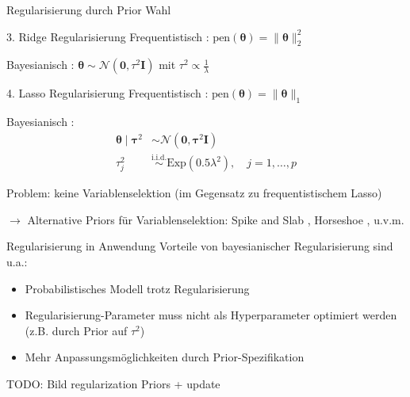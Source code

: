 \documentclass[
  ignorenonframetext,
  aspectratio=169,
]{beamer}
\providecommand{\tightlist}{%
  \setlength{\itemsep}{0pt}\setlength{\parskip}{0pt}}
\newcommand{\bnull}{\bm{0}}
\newcommand{\bI}{\bm{I}}
\newcommand{\Ncal}{\mathcal{N}}
\newcommand{\btheta}{\bm{\theta}}
\newcommand{\btaus}{\bm{\tau}^2}
\newcommand{\taus}{\tau^2}
\begin{document}
\begin{frame}{Regularisierung durch Prior Wahl}
\protect{}\label{regularisierung-durch-prior-wahl}
\begin{block}{3. Ridge Regularisierung}
\protect{}\label{ridge-regularisierung}
Frequentistisch \autocite{hoerl_ridge_1970,hoerl_ridge_1970-1}:
\(\text{pen}(\btheta) = \|\btheta\|_2^2\)

Bayesianisch \autocite{mackay_bayesian_1992}:
\(\btheta \sim \Ncal(\bnull, \taus \bI)\) mit
\(\taus \propto \frac{1}{\lambda}\)
\end{block}

\begin{block}{4. Lasso Regularisierung}
\protect{}\label{lasso-regularisierung}
Frequentistisch \autocite{tibshirani_regression_1996}:
\(\text{pen}(\btheta) = \|\btheta\|_1\)

Bayesianisch \autocite{park_bayesian_2008}: \[
\begin{aligned}
\btheta \mid \btaus &\sim \Ncal(\bnull, \btaus \bI) \\
        \taus_j &\overset{\text{i.i.d.}}{\sim} \text{Exp}(0.5 \lambda^2), \quad j = 1, \dots, p
\end{aligned}
\]
\end{block}

Problem: keine Variablenselektion (im Gegensatz zu frequentistischem
Lasso)

\(\to\) Alternative Priors für Variablenselektion: Spike and Slab
\autocite{mitchell_bayesian_1988}, Horseshoe
\autocite{carvalho_horseshoe_2010}, u.v.m.
\end{frame}

\begin{frame}{Regularisierung in Anwendung}
\protect{}\label{regularisierung-in-anwendung}
Vorteile von bayesianischer Regularisierung sind u.a.:

\begin{itemize}
\tightlist
\item
  Probabilistisches Modell trotz Regularisierung
\item
  Regularisierung-Parameter muss nicht als Hyperparameter optimiert
  werden (z.B. durch Prior auf \(\taus\))
\item
  Mehr Anpassungsmöglichkeiten durch Prior-Spezifikation
\end{itemize}

TODO: Bild regularization Priors + update
\end{frame}
\end{document}
